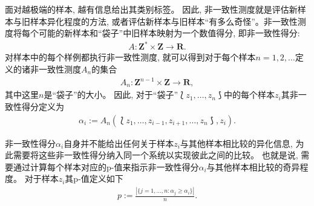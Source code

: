 面对越极端的样本, 越有信息给出其类别标签。 因此, 非一致性测度就是评估新样本与旧样本异化程度的方法, 或者评估新样本与旧样本“有多么奇怪”。非一致性测度将每个可能的新样本和“袋子”中旧样本映射为一个数值得分, 即非一致性得分:
\begin{align}
\label{nonconformity-score}
A: \mathbf{Z}^{*} \times \mathbf{Z} \rightarrow \mathbf{R}.
\end{align}
对样本中的每个样例都执行非一致性测度, 就可以得到对于每个样本$n = 1, 2, \ldots$定义的诸非一致性测度$A_{n}$的集合
\begin{align}
\label{nonconformity-set}
A_{n}: \mathbf{Z}^{n-1} \times \mathbf{Z} \rightarrow \mathbf{R},
\end{align}
其中这里$n$是“袋子”的大小。 因此, 对于“袋子”$\Lbag z_1, \ldots, z_{n} \Rbag$中的每个样本$z_{i}$其非一致性得分定义为
\begin{align}
\label{nonconformity-score-zi}
\alpha_{i} := A_{n}(\Lbag z_1, \ldots, z_{i-1}, z_{i+1}, \ldots, z_{n} \Rbag, z_{i}).
\end{align}

非一致性得分$\alpha_{i}$自身并不能给出任何关于样本$z_{i}$与其他样本相比较的异化信息, 为此需要将这些非一致性得分纳入同一个系统以实现彼此之间的比较。 也就是说, 需要通过计算每个样本对应的p-值来指示非一致性得分$\alpha_{i}$与其他样本相比较的奇异程度。 对于样本$z_{i}$其p-值定义如下
\begin{align}
\label{p-value}
p := \frac{|\{j = 1, \ldots, n: \alpha_{j} \geq \alpha_{i}\}|}{n}.
\end{align}

